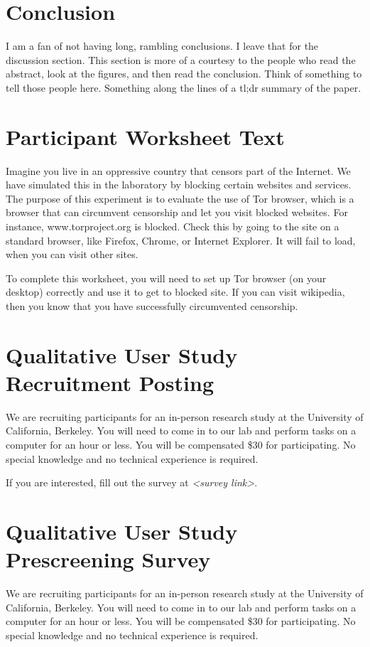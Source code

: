 \documentclass{template}
\begin{document}

\section{Conclusion} 
{\color {red} I am a fan of not having long, rambling conclusions. I leave
that for the discussion section. This section is more of a courtesy to the 
people who read the abstract, look at the figures, and then read the 
conclusion. Think of something to tell those people here. Something along
the lines of a tl;dr summary of the paper.} 




\appendix
\section{Participant Worksheet Text} 
\label{participant-worksheet}
Imagine you live in an oppressive country that censors part of the Internet. We have simulated this in the laboratory by blocking certain websites and services. The purpose of this experiment is to evaluate the use of Tor browser, which is a browser that can circumvent censorship and let you visit blocked websites. For instance, www.torproject.org is blocked. Check this by going to the site on a standard browser, like Firefox, Chrome, or Internet Explorer. It will fail to load, when you can visit other sites.

To complete this worksheet, you will need to set up Tor browser (on your desktop) correctly and use it to get to blocked site. If you can visit wikipedia, then you know that you have successfully circumvented censorship.

\section{Qualitative User Study Recruitment Posting} 
We are recruiting participants for an in-person research study at the University of California, Berkeley. You will need to come in to our lab and perform tasks on a computer for an hour or less. You will be compensated \$30 for participating. 
No special knowledge and no technical experience is required. 

If you are interested, fill out the survey at \textit{<survey link>}. 

\section{Qualitative User Study Prescreening Survey} 
\label{qualitative-prescreening}
We are recruiting participants for an in-person research study at the University of California, Berkeley. You will need to come in to our lab and perform tasks on a computer for an hour or less. You will be compensated \$30 for participating. No special knowledge and no technical experience is required.
\end{document}
